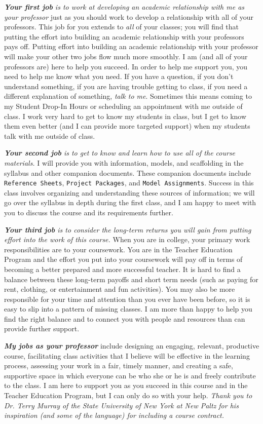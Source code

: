 \textit{\textbf{Your first job} is to work at developing an academic relationship with me as your professor} just as you should work to develop a relationship with all of your professors. This job for you extends to \emph{all} of your classes; you will find that putting the effort into building an academic relationship with your professors pays off. Putting effort into building an academic relationship with your professor will make your other two jobs flow much more smoothly. I am (and all of your professors are) here to help you succeed. In order to help me support you, you need to help me know what you need. If you have a question, if you don't understand something, if you are having trouble getting to class, if you need a different explanation of something, \emph{talk to me}. Sometimes this means coming to my Student Drop-In Hours or scheduling an appointment with me outside of class. I work very hard to get to know my students in class, but I get to know them even better (and I can provide more targeted support) when my students talk with me outside of class.

\textit{\textbf{Your second job} is to get to know and learn how to use all of the course materials.} I will provide you with information, models, and scaffolding in the syllabus and other companion documents. These companion documents include \texttt{Reference Sheets}, \texttt{Project Packages}, and \texttt{Model Assignments}. Success in this class involves organizing and understanding these sources of information; we will go over the syllabus in depth during the first class, and I am happy to meet with you to discuss the course and its requirements further.

\textit{\textbf{Your third job} is to consider the long-term returns you will gain from putting effort into the work of this course.} When you are in college, your primary work responsibilities are to your coursework. You are in the Teacher Education Program and the effort you put into your coursework will pay off in terms of becoming a better prepared and more successful teacher. It is hard to find a balance between these long-term payoffs and short term needs (such as paying for rent, clothing, or entertainment and fun activities). You may also be more responsible for your time and attention than you ever have been before, so it is easy to slip into a pattern of missing classes. I am more than happy to help you find the right balance and to connect you with people and resources than can provide further support.

\textit{\textbf{My jobs as your professor}} include designing an engaging, relevant, productive course, facilitating class activities that I believe will be effective in the learning process, assessing your work in a fair, timely manner, and creating a safe, supportive space in which everyone can be who she or he is and freely contribute to the class. I am here to support you as you succeed in this course and in the Teacher Education Program, but I can only do so with your help.
\bigskip
\small\textit{Thank you to Dr. Terry Murray of the State University of New York at New Paltz for his inspiration (and some of the language) for including a course contract.}\normalsize

